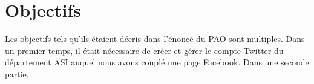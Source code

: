 \section{Objectifs}
Les objectifs tels qu'ils étaient décris dans l'énoncé du PAO sont multiples. Dans un premier temps, il était nécessaire de créer et gérer le compte Twitter du département ASI auquel nous avons couplé une page Facebook. Dans une seconde partie, 
